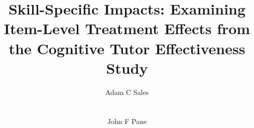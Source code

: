 \documentclass{edm_template}
\begin{document}
\title{Skill-Specific Impacts: Examining Item-Level Treatment Effects
  from the Cognitive Tutor Effectiveness Study}
%
%
%
%
%

%
\author{
%
%
\alignauthor
Adam C Sales\\
       \\
       \\
\alignauthor
John F Pane\\
       \\
       \\
}
\end{document}
